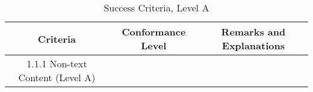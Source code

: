 \begin{table}[]
    \centering
    \begin{tabular}{c|c|c}
        Criteria & Conformance Level & Remarks and Explanations \\ \hline
        1.1.1 Non-text Content (Level A) &
    \end{tabular}
    \caption{Success Criteria, Level A}
    \label{tab:my_label}
\end{table}